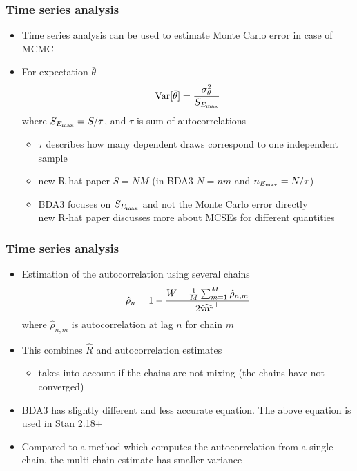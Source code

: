 \documentclass[10pt]{beamer}
\begin{document}
\begin{frame}

\frametitle{ Time series analysis}

  \begin{itemize}
  \item Time series analysis can be used to estimate Monte Carlo
    error in case of MCMC
  \item For expectation $\bar{\theta}$
    \begin{equation*}
      \mathrm{Var}[\bar{\theta}] = \frac{\sigma^2_\theta}{S_{E_{\rm max}}}
    \end{equation*}
    where $S_{E_{\rm max}}=S/\tau$, and $\tau$ is sum of autocorrelations
    \begin{itemize}
      \item<2-> $\tau$ describes how many dependent draws correspond to one independent sample
      \item<3-> new R-hat paper $S=NM$ (in BDA3 $N=nm$ and $n_{E_{\rm max}}=N/\tau$)
      \item<4-> BDA3 focuses on $S_{E_{\rm max}}$ and not the Monte Carlo error directly\\
        new R-hat paper discusses more about MCSEs for different quantities
    \end{itemize}
  \end{itemize}
\end{frame}

\begin{frame}

\frametitle{ Time series analysis}

  \begin{itemize}
  \item Estimation of the autocorrelation using several chains
    \begin{equation*}
      \hat{\rho}_n=1-\frac{W - \frac{1}{M}\sum_{m=1}^M \hat{\rho}_{n,m}}{2\widehat{\mathrm{var}}^{+}}
    \end{equation*}
    where $\hat{\rho}_{n,m}$ is autocorrelation at lag $n$ for chain $m$
  \item<2-> This combines $\widehat{R}$ and autocorrelation estimates
    \begin{itemize}
    \item takes into account if the chains are not mixing (the chains have not converged)
    \end{itemize}
  \item<3-> BDA3 has slightly different and less accurate equation. The
    above equation is used in Stan 2.18+
  \item<4-> Compared to a method which computes the autocorrelation
    from a single chain, the multi-chain estimate has smaller variance
 \end{itemize}
\end{frame}
\end{document}
